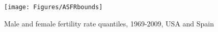 

\begin{figure}[ht!]
        \centering  
          \caption{Male and female fertility rate quantiles, 1969-2009, USA and
          Spain}
           \texttt{[image: Figures/ASFRbounds]}
          \label{fig:TFRboundsseries}
\end{figure}

 \FloatBarrier